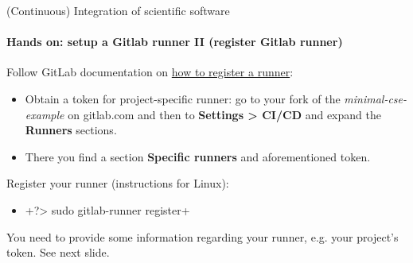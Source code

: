 \begin{frame}{(Continuous) Integration of scientific software}
    \framesubtitle{Hands on: setup a Gitlab runner II (register Gitlab runner)}
    Follow GitLab documentation on \href{https://docs.gitlab.com/runner/register/index.html}{how to register a runner}:
    \begin{itemize}
        \item Obtain a token for project-specific runner: go to your fork of the \emph{minimal-cse-example} on gitlab.com and then to \textbf{Settings > CI/CD} and expand the \textbf{Runners} sections.
        \item There you find a section \textbf{Specific runners} and aforementioned token.
    \end{itemize}
    Register your runner (instructions for Linux):
    \begin{itemize}
        \item {}+?> sudo gitlab-runner register+
    \end{itemize}
    You need to provide some information regarding your runner, e.g. your project's token. See next slide.
\end{frame}


